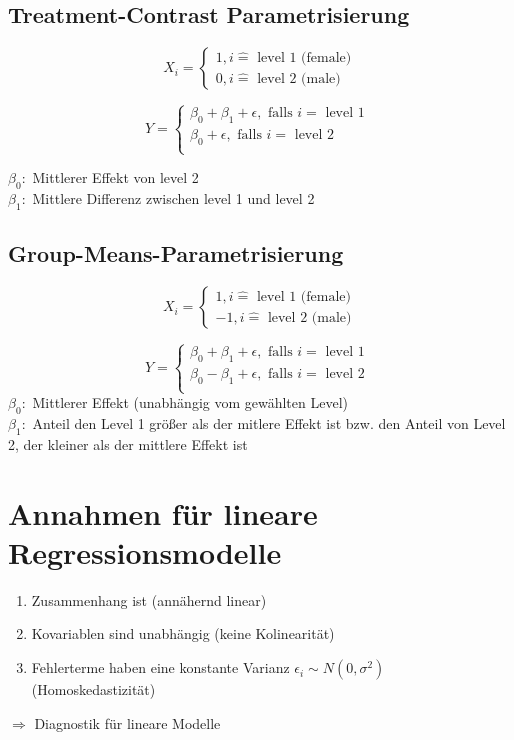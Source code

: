\subsection{Treatment-Contrast Parametrisierung}
\[ X_i = \begin{cases}
		1, i \hat{=} \text{ level 1 (female)} \\
		0, i \hat{=} \text{ level 2 (male)}
\end{cases} \]

\[ Y = \begin{cases}
		\beta_0 + \beta_1 + \epsilon, \text{ falls } i = \text{ level 1 } \\
		\beta_0 + \epsilon, \text{ falls } i = \text{ level 2 } \\
\end{cases} \]

$\beta_0:$ Mittlerer Effekt von level 2\\
$\beta_1:$ Mittlere Differenz zwischen level 1 und level 2\\

\subsection{Group-Means-Parametrisierung}
\[ X_i = \begin{cases}
		1, i \hat{=} \text{ level 1 (female)} \\
		-1, i \hat{=} \text{ level 2 (male)}
\end{cases} \]

\[ Y = \begin{cases}
		\beta_0 + \beta_1 + \epsilon, \text{ falls } i = \text{ level 1 } \\
		\beta_0 - \beta_1 + \epsilon, \text{ falls } i = \text{ level 2 } \\
\end{cases} \]
$\beta_0:$ Mittlerer Effekt (unabhängig vom gewählten Level)\\
$\beta_1:$ Anteil den Level 1 größer als der mitlere Effekt ist bzw. den Anteil von Level 2, der kleiner als der mittlere Effekt ist\\

\section{Annahmen für lineare Regressionsmodelle}
\begin{enumerate}
	\item Zusammenhang ist (annähernd linear)
	\item Kovariablen sind unabhängig (keine Kolinearität)
	\item Fehlerterme haben eine konstante Varianz $\epsilon_i \sim N(0, \sigma^{2} )$ (Homoskedastizität)
\end{enumerate}
$\Rightarrow$ Diagnostik für lineare Modelle

